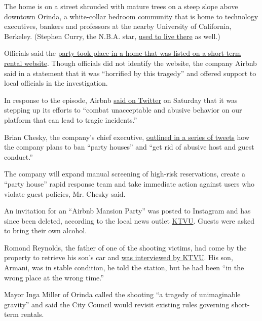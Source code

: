The home is on a street shrouded with mature trees on a steep slope
above downtown Orinda, a white-collar bedroom community that is home to
technology executives, bankers and professors at the nearby University
of California, Berkeley. (Stephen Curry, the N.B.A. star,
\href{https://www.sfgate.com/realestate/article/Steph-Curry-puts-Orinda-home-on-market-for-3-895-7444269.php}{used
to live there} as well.)

Officials said the
\href{https://www.nytimes3xbfgragh.onion/2015/10/10/your-money/new-worry-for-home-buyers-a-party-house-next-door.html}{party
took place in a home that was listed on a short-term rental website}.
Though officials did not identify the website, the company Airbnb said
in a statement that it was ``horrified by this tragedy'' and offered
support to local officials in the investigation.

In response to the episode, Airbnb
\href{https://twitter.com/Airbnb/status/1190698126148960256}{said on
Twitter} on Saturday that it was stepping up its efforts to ``combat
unacceptable and abusive behavior on our platform that can lead to
tragic incidents.''

Brian Chesky, the company's chief executive,
\href{https://twitter.com/bchesky/status/1190675126594879489}{outlined
in a series of tweets} how the company plans to ban ``party houses'' and
``get rid of abusive host and guest conduct.''

The company will expand manual screening of high-risk reservations,
create a ``party house'' rapid response team and take immediate action
against users who violate guest policies, Mr. Chesky said.

An invitation for an ``Airbnb Mansion Party'' was posted to Instagram
and has since been deleted, according to the local news outlet
\href{https://www.ktvu.com/news/four-dead-others-injured-at-halloween-party-in-orinda-airbnb-horrified-about-tragedy}{KTVU}.
Guests were asked to bring their own alcohol.

Romond Reynolds, the father of one of the shooting victims, had come by
the property to retrieve his son's car and
\href{https://www.ktvu.com/news/four-dead-others-injured-at-halloween-party-in-orinda-airbnb-horrified-about-tragedy}{was
interviewed by KTVU}. His son, Armani, was in stable condition, he told
the station, but he had been ``in the wrong place at the wrong time.''

Mayor Inga Miller of Orinda called the shooting ``a tragedy of
unimaginable gravity'' and said the City Council would revisit existing
rules governing short-term rentals.

